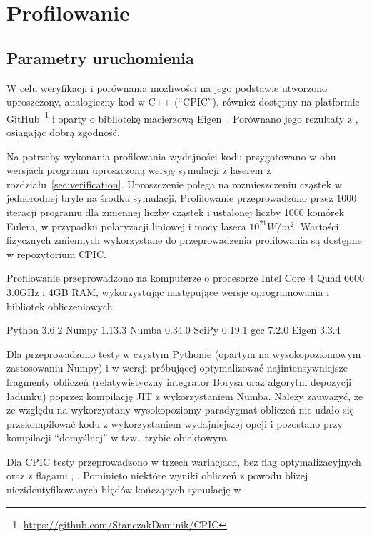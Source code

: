\section[Profilowanie]{Profilowanie}\label{sec:profiling} 

\subsection{Parametry uruchomienia}

W celu weryfikacji i porównania możliwości \pythonpic{} na jego podstawie
utworzono uproszczony, analogiczny kod w C++ (``CPIC''), również dostępny na platformie
GitHub~\footnote{\url{https://github.com/StanczakDominik/CPIC}} i oparty o bibliotekę macierzową Eigen~\cite{eigen}.
Porównano jego rezultaty z \pythonpic{}, osiągając dobrą zgodność.


Na potrzeby wykonania profilowania wydajności kodu przygotowano w obu wersjach
programu uproszczoną wersję symulacji z laserem z rozdziału~\ref{sec:verification}.
Uproszczenie polega na rozmieszczeniu cząstek w jednorodnej bryle na środku symulacji.
Profilowanie przeprowadzono przez 1000 iteracji programu dla zmiennej liczby cząstek i ustalonej liczby 1000
komórek Eulera, w przypadku polaryzacji liniowej i mocy lasera $10^{21} W/m^2$.
Wartości fizycznych zmiennych wykorzystane do przeprowadzenia profilowania są dostępne w repozytorium CPIC.

Profilowanie przeprowadzono na komputerze o procesorze 
Intel Core 4 Quad 6600 3.0GHz i 4GB RAM, wykorzystując następujące wersje
oprogramowania i bibliotek obliczeniowych:
\begin{itemize}
\itemi{} Python 3.6.2
\itemi{} Numpy 1.13.3
\itemi{} Numba 0.34.0
\itemi{} SciPy 0.19.1
\itemi{} gcc 7.2.0
\itemi{} Eigen 3.3.4
\end{itemize}

Dla \pythonpic{} przeprowadzono testy w czystym Pythonie (opartym na wysokopoziomowym zastosowaniu Numpy)
i w wersji próbującej optymalizować najintensywniejsze fragmenty obliczeń (relatywistyczny integrator Borysa
oraz algorytm depozycji ładunku) poprzez kompilację JIT z wykorzystaniem Numba. Należy zauważyć, że ze względu
na wykorzystany wysokopoziomy paradygmat obliczeń nie udało się przekompilować kodu z wykorzystaniem
wydajniejszej opcji  i pozostano przy kompilacji ``domyślnej'' w tzw.\ trybie obiektowym.

Dla CPIC testy przeprowadzono w trzech wariacjach, bez flag optymalizacyjnych oraz z flagami , .
Pominięto niektóre wyniki obliczeń z powodu bliżej niezidentyfikowanych błędów kończących symulację w 

